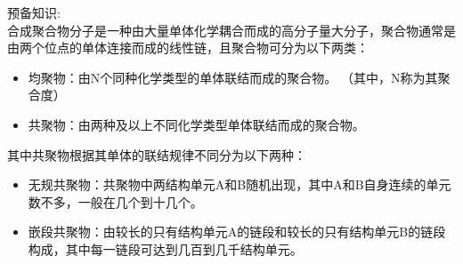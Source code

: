 
预备知识:\\

合成聚合物分子是一种由大量单体化学耦合而成的高分子量大分子，聚合物通常是由两个位点的单体连接而成的线性链，且聚合物可分为以下两类：
\begin{itemize}
	\item 均聚物：由N个同种化学类型的单体联结而成的聚合物。
	（其中，N称为其聚合度）
	\item 共聚物：由两种及以上不同化学类型单体联结而成的聚合物。
\end{itemize}
其中共聚物根据其单体的联结规律不同分为以下两种：
\begin{itemize}
	\item 无规共聚物：共聚物中两结构单元A和B随机出现，其中A和B自身连续的单元数不多，一般在几个到十几个。
	\item 嵌段共聚物：由较长的只有结构单元A的链段和较长的只有结构单元B的链段构成，其中每一链段可达到几百到几千结构单元。
\end{itemize}

